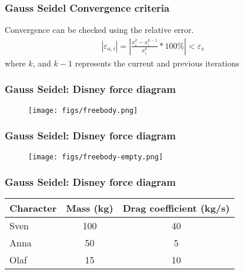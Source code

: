 \documentclass[notes]{beamer}
\begin{document}
\begin{frame}
	\frametitle{Gauss Seidel Convergence criteria}
	Convergence can be checked using the relative error.
	\begin{align*}
	\left|\varepsilon_{a, i}\right| = \left|\frac{x_i^k - x_i^{k-1}}{x_i^k}*100\% \right|< \varepsilon_s
	\end{align*}
	where $k$, and $k-1$ represents the current and previous iterations
\end{frame}




\begin{frame}
	\frametitle{Gauss Seidel: Disney force diagram}
		\begin{figure}[ht]
			\centering
			\texttt{[image: figs/freebody.png]}
		\end{figure}
\end{frame}


\begin{frame}
	\frametitle{Gauss Seidel: Disney force diagram}
		\begin{figure}[ht]
			\centering
			\texttt{[image: figs/freebody-empty.png]}
		\end{figure}		
\end{frame}



\begin{frame}
	\frametitle{Gauss Seidel: Disney force diagram}
	\begin{table}[]
		\begin{tabular}{lcc}
			\toprule
			\textbf{Character} & \textbf{Mass (kg)} & \textbf{Drag coefficient (kg/s)} \\
			\midrule
			Sven               & 100                & 40                               \\
			Anna               & 50                 & 5                                \\
			Olaf               & 15                 & 10                               \\
			\bottomrule
		\end{tabular}
	\end{table}
\end{frame}
\end{document}
